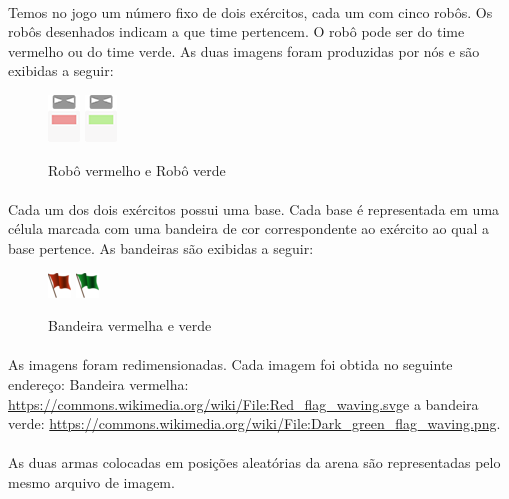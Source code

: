 \documentclass[a4paper]{article}
\begin{document}
 \paragraph{}
 Temos no jogo um número fixo de dois exércitos, cada um com cinco robôs. Os robôs desenhados indicam a que time pertencem. O robô pode ser do time vermelho ou do time verde. As duas imagens foram produzidas por nós e são exibidas a seguir:
 
 \begin{figure}[h]
 \begin{center}
 \includegraphics[scale=0.8]{rr.png}
 \includegraphics[scale=0.8]{rg.png}
 \caption{Robô vermelho e Robô verde}
 \label{fig:rbot}
 \end{center} 
 \end{figure}
 
 \paragraph{}
 Cada um dos dois exércitos possui uma base. Cada base é representada em uma célula marcada com uma bandeira de cor correspondente ao exército ao qual a base pertence. As bandeiras são exibidas a seguir:
 
 \begin{figure}[h]
 \begin{center}
 \includegraphics[scale=0.8]{rf.png}
 \includegraphics[scale=0.8]{gf.png}
 \caption{Bandeira vermelha e verde}
 \label{fig:flags}
 \end{center} 
 \end{figure}
 
 \paragraph{}
 As imagens foram redimensionadas. Cada imagem foi obtida no seguinte endereço:
Bandeira vermelha: \url{https://commons.wikimedia.org/wiki/File:Red_flag_waving.svg}e a bandeira verde: \url{https://commons.wikimedia.org/wiki/File:Dark_green_flag_waving.png}.  \paragraph{}
As duas armas colocadas em posições aleatórias da arena são representadas pelo mesmo arquivo de imagem.
  
\end{document}

